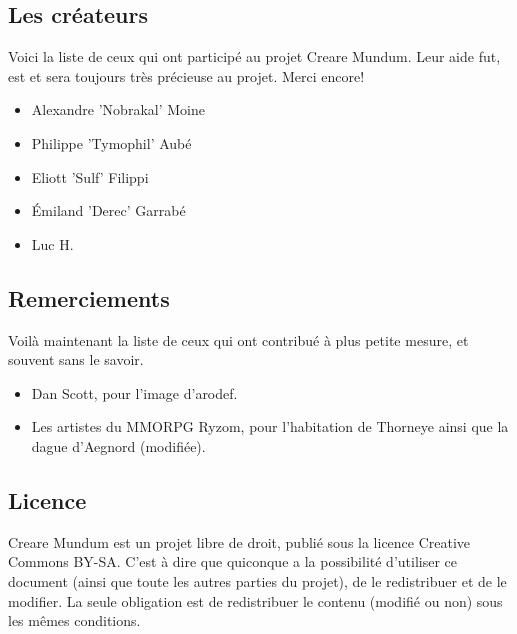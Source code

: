 \documentclass{book}
\begin{document}
\subsection{Les créateurs}
Voici la liste de ceux qui ont participé au projet Creare Mundum. Leur aide fut, est et sera toujours très précieuse au projet. Merci encore!  
\begin{itemize}
\item Alexandre ’Nobrakal’ Moine 
\item Philippe ’Tymophil’ Aubé 
\item Eliott ’Sulf’ Filippi
\item Émiland ’Derec’ Garrabé
\item Luc H.
\end{itemize}
\subsection{Remerciements}
Voilà maintenant la liste de ceux qui ont contribué à plus petite mesure, et souvent sans le savoir. 
\begin{itemize}
\item Dan Scott, pour l’image d’arodef.
\item Les artistes du MMORPG Ryzom, pour l'habitation de Thorneye ainsi que la dague d'Aegnord (modifiée). 
\end{itemize}
\subsection{Licence}
Creare Mundum est un projet libre de droit, publié sous la licence Creative Commons BY-SA. C'est à dire que quiconque a la possibilité d'utiliser ce document (ainsi que toute les autres parties du projet), de le redistribuer et de le modifier. La seule obligation est de redistribuer le contenu (modifié ou non) sous les mêmes conditions.
\end{document}
